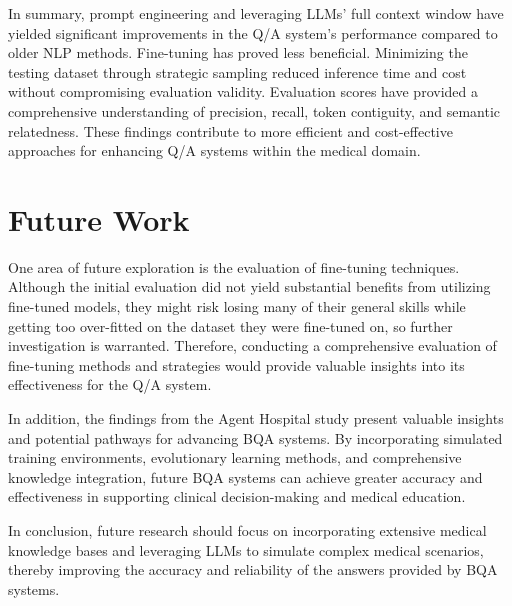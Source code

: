 \documentclass[onecolumn, conference]{IEEEtran}
\begin{document}
In summary, prompt engineering and leveraging LLMs' full context window have yielded significant improvements in the Q/A system's performance compared to older NLP methods. Fine-tuning has proved less beneficial. Minimizing the testing dataset through strategic sampling reduced inference time and cost without compromising evaluation validity. Evaluation scores have provided a comprehensive understanding of precision, recall, token contiguity, and semantic relatedness. These findings contribute to more efficient and cost-effective approaches for enhancing Q/A systems within the medical domain.

\section{Future Work}

One area of future exploration is the evaluation of fine-tuning techniques. Although the initial evaluation did not yield substantial benefits from utilizing fine-tuned models, they might risk losing many of their general skills while getting too over-fitted on the dataset they were fine-tuned on, so further investigation is warranted. Therefore, conducting a comprehensive evaluation of fine-tuning methods and strategies would provide valuable insights into its effectiveness for the Q/A system.

In addition, the findings from the Agent Hospital study \cite{Li2024} present valuable insights and potential pathways for advancing BQA systems. By incorporating simulated training environments, evolutionary learning methods, and comprehensive knowledge integration, future BQA systems can achieve greater accuracy and effectiveness in supporting clinical decision-making and medical education.

In conclusion, future research should focus on incorporating extensive medical knowledge bases and leveraging LLMs to simulate complex medical scenarios, thereby improving the accuracy and reliability of the answers provided by BQA systems.


\end{document}
